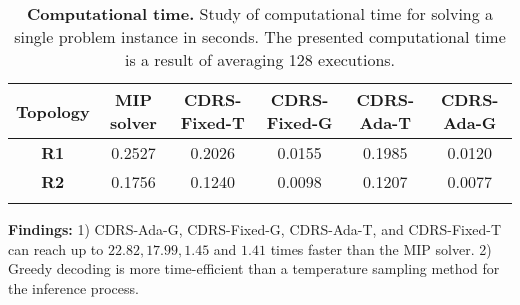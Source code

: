 \begin{table*}[t!] \centering
	\begin{small}
		\begin{tabular}{@{}cccccc@{}}\toprule
			\textbf{Topology}& \textbf{MIP solver} &\textbf{CDRS-Fixed-T} & \textbf{CDRS-Fixed-G}  & \textbf{CDRS-Ada-T} & \textbf{CDRS-Ada-G}
			\\ \midrule
			\textbf{R1} &      0.2527   & 0.2026 & 0.0155& 0.1985 & 0.0120          
			\\ \hdashline
			{\textbf{R2}} &  0.1756 &  0.1240 & 0.0098 & 0.1207 &0.0077
			\\ \hdashline
			\bottomrule
		\end{tabular}
	\end{small}
	\caption{\small \textbf{Computational time.} Study of computational time for solving a single problem instance in seconds. The presented computational time is a result of averaging 128 executions.}
	\label{table:computationaltime}
	\vspace{-3mm}
\end{table*}

\textbf{Findings:} 1) CDRS-Ada-G, CDRS-Fixed-G, CDRS-Ada-T, and CDRS-Fixed-T can reach up to $22.82, 17.99, 1.45$ and $1.41$ times faster than the MIP solver. 2) Greedy decoding is more time-efficient than a temperature sampling method for the inference process.
